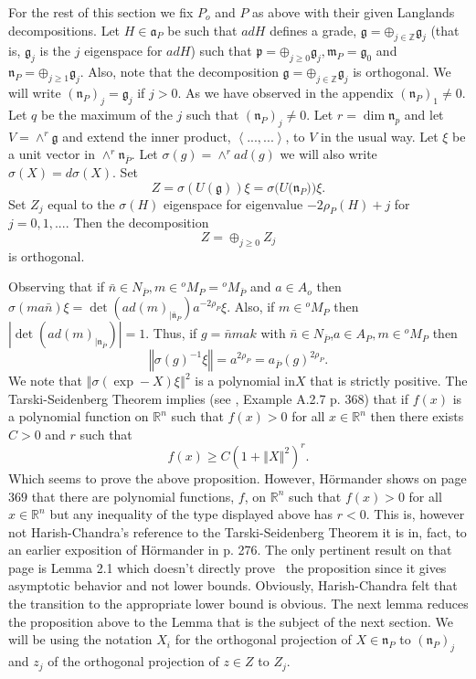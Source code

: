 \documentclass[12pt]{article}%
\begin{document}
For the rest of this section we fix $P_{o}$ and $P$ as above with their given
Langlands decompositions. Let $H\in\mathfrak{a}_{P}$ be such that $adH $
defines a grade, $\mathfrak{g=\oplus}_{j\in\mathbb{Z}}\mathfrak{g}_{j}$ (that
is, $\mathfrak{g}_{j}$ is the $j$ eigenspace for $adH$) such that
$\mathfrak{p=\oplus}_{j\geq0}\mathfrak{g}_{j},\mathfrak{m}_{P}=\mathfrak{g}%
_{0}$ and $\mathfrak{n}_{P}=\mathfrak{\oplus}_{j\geq1}\mathfrak{g}_{j}$. Also,
note that the decomposition $\mathfrak{g=\oplus}_{j\in\mathbb{Z}}%
\mathfrak{g}_{j}$ is orthogonal. We will write $\left(  \mathfrak{n}%
_{P}\right)  _{j}=\mathfrak{g}_{j}$ if $j>0$. As we have observed in the
appendix $\left(  \mathfrak{n}_{P}\right)  _{1}\neq0$. Let $q$ be the maximum
of the $j$ such that $\left(  \mathfrak{n}_{P}\right)  _{j}\neq0$. Let
$r=\dim\mathfrak{n}_{p}$ and let $V=\wedge^{r}\mathfrak{g}$ and extend the
inner product, $\left\langle ...,...\right\rangle $, to $V$ in the usual way.
Let $\xi$ be a unit vector in $\wedge^{r}\mathfrak{n}_{\bar{P}}\mathfrak{.}$
Let $\sigma(g)=\wedge^{r}ad(g)$ we will also write $\sigma(X)=d\sigma(X)$. Set%
\[
Z=\sigma(U(\mathfrak{g}))\xi=\sigma(U(\mathfrak{n}_{P}\mathfrak{))\xi.}
\]
Set $Z_{j}$ equal to the $\sigma(H)$ eigenspace for eigenvalue $-2\rho
_{P}(H)+j$ for $j=0,1,...$. Then the decomposition
\[
Z=\oplus_{j\geq0}Z_{j}
\]
is orthogonal.

Observing that if $\bar{n}\in N_{\bar{P}},m\in{}^{o}M_{P}={}^{o}M_{\bar{P}}$
and $a\in A_{o}$ then $\sigma(ma\bar{n})\xi=\det(ad(m)_{|\mathfrak{\bar{n}%
}_{P}})a^{-2\rho_{P}}\xi$. Also, if $m\in{}^{o}M_{P}$ then $\left\vert
\det(ad(m)_{|\mathfrak{\mathfrak{n}}_{\bar{P}}})\right\vert =1$. Thus, if
$g=\bar{n}mak$ with $\bar{n}\in N_{\bar{P}}$,$a\in A_{P},m\in{}^{o}M_{P}$ then%
\[
\left\Vert \sigma(g)^{-1}\xi\right\Vert =a^{2\rho_{P}}=a_{\bar{P}}%
(g)^{2\rho_{P}}.
\]
We note that $\left\Vert \sigma(\exp-X)\xi\right\Vert ^{2}$ is a polynomial
in$X$ that is strictly positive. The Tarski-Seidenberg Theorem implies (see
\cite{Hor2}, Example A.2.7 p. 368) that if $f(x)$ is a polynomial function on
$\mathbb{R}^{n}$ such that $f(x)>0$ for all $x\in\mathbb{R}^{n}$ then there
exists $C>0$ and $r$ such that%
\[
f(x)\geq C(1+\left\Vert X\right\Vert ^{2})^{r}.
\]
Which seems to prove the above proposition. However, H\"{o}rmander shows on
page $369$ that there are polynomial functions, $f$, on $\mathbb{R}^{n}$ such
that $f(x)>0$ for all $x\in\mathbb{R}^{n}$ but any inequality of the type
displayed above has $r<0$. This is, however not Harish-Chandra's reference to
the Tarski-Seidenberg Theorem it is in, fact, to an earlier exposition of
H\"{o}rmander in \cite{Hor1} p. 276. The only pertinent result on that page is
Lemma 2.1 which doesn't directly prove \ the proposition since it gives
asymptotic behavior and not lower bounds. Obviously, Harish-Chandra felt that
the transition to the appropriate lower bound is obvious. The next lemma
reduces the proposition above to the Lemma that is the subject of the next
section. We will be using the notation $X_{i}$ for the orthogonal projection
of $X\in\mathfrak{n}_{P}$ to $\left(  \mathfrak{n}_{P}\right)  _{j}$ and
$z_{j}$ of the orthogonal projection of $z\in Z$ to $Z_{j}$.
\end{document}
